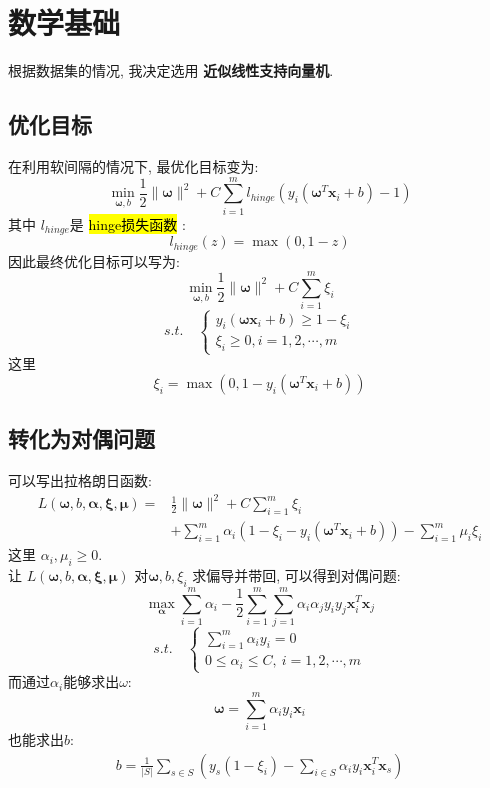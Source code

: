 \documentclass[UTF8]{article}
\newcommand{\hlg}[1]{
	\begingroup
		\sethlcolor{lgray}%
		\textcolor{black}{\hl{\mbox{#1}}}%
	\endgroup
}
\begin{document}
\section{数学基础}
根据数据集的情况, 我决定选用 \textbf{近似线性支持向量机}.
\subsection{优化目标}
\noindent 在利用软间隔的情况下, 最优化目标变为:
$$\min\limits_{\bm{\omega},b}\frac{1}{2}\|\bm{\omega}\|^2+C\sum\limits_{i=1}^ml_{hinge}(y_i(\bm{\omega}^T\bm{x}_i+b)-1)$$
其中 $l_{hinge}$是 \hlg{hinge损失函数}:
$$l_{hinge}(z)=\max(0,1-z)$$
因此最终优化目标可以写为:
$$\min\limits_{\bm{\omega},b}\frac{1}{2}\|\bm{\omega}\|^2+C\sum\limits_{i=1}^m\xi_i$$
$$s.t.\quad\left\{\begin{array}{l}
	y_i(\bm{\omega}\bm{x}_i+b)\ge1-\xi_i\\
	\xi_i\ge0,i=1,2,\cdots,m
\end{array}\right.$$
这里
$$\xi_i=\max(0,1-y_i(\bm{\omega}^T\bm{x}_i+b))$$
\subsection{转化为对偶问题}
\noindent 可以写出拉格朗日函数:
\begin{align*}
	L(\bm{\omega},b,\bm{\alpha},\bm{\xi},\bm{\mu})=&\frac{1}{2}\|\bm{\omega}\|^2+C\sum\limits_{i=1}^m\xi_i\\
	& +\sum\limits_{i=1}^m\alpha_i(1-\xi_i-y_i(\bm{\omega}^T\bm{x}_i+b))-\sum\limits_{i=1}^m\mu_i\xi_i
\end{align*}
这里 $\alpha_i,\mu_i\ge0$.\\
让 $L(\bm{\omega},b,\bm{\alpha},\bm{\xi},\bm{\mu})$ 对$\bm{\omega},b,\xi_i$ 求偏导并带回, 可以得到对偶问题:
$$\max\limits_{\bm{\alpha}}\sum\limits_{i=1}^m\alpha_i-\frac{1}{2}\sum\limits_{i=1}^m\sum\limits_{j=1}^m\alpha_i\alpha_jy_iy_j\bm{x}_i^T\bm{x}_j$$
$$s.t.\quad\left\{\begin{array}{l}
	\sum\limits_{i=1}^m\alpha_iy_i=0\\
	0\le\alpha_i\le C,\ i=1,2,\cdots,m
\end{array}\right.$$
而通过$\alpha_i$能够求出$\omega$:
$$\bm{\omega}=\sum\limits_{i=1}^m\alpha_iy_i\bm{x}_i$$
也能求出$b$:
\begin{align*}
	b=\frac{1}{|S|}\sum\limits_{s\in S}\left(y_s(1-\xi_i) - \sum\limits_{i\in S}\alpha_iy_i\bm{x}_i^T\bm{x}_s\right)
\end{align*}
\end{document}
